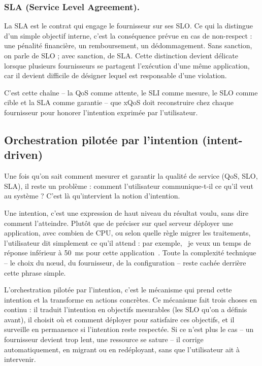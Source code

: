 \subsubsection{SLA (Service Level Agreement).} La SLA est le contrat qui engage le fournisseur sur ses SLO. Ce qui la distingue d'un simple objectif interne, c'est la conséquence prévue en cas de non-respect : une pénalité financière, un remboursement, un dédommagement. Sans sanction, on parle de SLO ; avec sanction, de SLA. Cette distinction devient délicate lorsque plusieurs fournisseurs se partagent l'exécution d'une même application, car il devient difficile de désigner lequel est responsable d'une violation.

C'est cette chaîne -- la QoS comme attente, le SLI comme mesure, le SLO comme cible et la SLA comme garantie -- que xQoS doit reconstruire chez chaque fournisseur pour honorer l'intention exprimée par l'utilisateur.

\subsection{Orchestration pilotée par l'intention (intent-driven)}
\label{sec:intent-driven}

Une fois qu'on sait comment mesurer et garantir la qualité de service (QoS, SLO, SLA), il reste un problème : comment l'utilisateur communique-t-il ce qu'il veut au système ? C'est là qu'intervient la notion d'intention.

Une intention, c'est une expression de haut niveau du résultat voulu, sans dire comment l'atteindre. Plutôt que de préciser sur quel serveur déployer une application, avec combien de CPU, ou selon quelle règle migrer les traitements, l'utilisateur dit simplement ce qu'il attend : par exemple, \og~je veux un temps de réponse inférieur à 50~ms pour cette application~\fg{}. Toute la complexité technique -- le choix du nœud, du fournisseur, de la configuration -- reste cachée derrière cette phrase simple.

L'orchestration pilotée par l'intention, c'est le mécanisme qui prend cette intention et la transforme en actions concrètes. Ce mécanisme fait trois choses en continu : il traduit l'intention en objectifs mesurables (les SLO qu'on a définis avant), il choisit où et comment déployer pour satisfaire ces objectifs, et il surveille en permanence si l'intention reste respectée. Si ce n'est plus le cas -- un fournisseur devient trop lent, une ressource se sature -- il corrige automatiquement, en migrant ou en redéployant, sans que l'utilisateur ait à intervenir.



